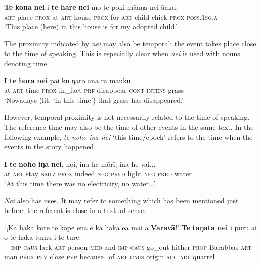 \ea\label{ex:4.206}
\gll \textbf{Te} \textbf{kona} \textbf{nei} {\ꞌ}i \textbf{te} \textbf{hare} \textbf{nei} mo te poki mā{\ꞌ}aŋa nei {\ꞌ}ā{\ꞌ}aku. \\
\textsc{art} place \textsc{prox} at \textsc{art} house \textsc{prox} for \textsc{art} child chick \textsc{prox} \textsc{poss.1sg.a} \\

\glt
‘This place (here) in this house is for my adopted child.’ \textstyleExampleref{[R229.271]} 
\z

The proximity indicated by \textit{nei} may also be temporal: the event takes place close to the time of speaking. This is especially clear when \textit{nei} is used with nouns denoting time.

\ea\label{ex:4.207}
\gll \textbf{{\ꞌ}I} \textbf{te} \textbf{hora} \textbf{nei} pa{\ꞌ}i ku ŋaro {\ꞌ}ana rā mauku.\\
at \textsc{art} time \textsc{prox} in\_fact \textsc{prf} disappear \textsc{cont} \textsc{intens} grass\\

\glt
‘Nowadays (lit. ‘in this time’) that grass has disappeared.’ \textstyleExampleref{[R106.050]} 
\z

However, temporal proximity is not necessarily related to the time of speaking. The reference time may also be the time of other events in the same text. In the following example, \textit{te noho iŋa nei} ‘this time/epoch’ refers to the time when the events in the story happened. 

\ea\label{ex:4.208}
\gll \textbf{{\ꞌ}I} \textbf{te} \textbf{noho} \textbf{iŋa} \textbf{nei}, ho{\ꞌ}i, {\ꞌ}ina he mōrī, {\ꞌ}ina he vai... \\
at \textsc{art} stay \textsc{nmlz} \textsc{prox} indeed \textsc{neg} \textsc{pred} light \textsc{neg} \textsc{pred} water \\

\glt
‘At this time there was no electricity, no water...’ \textstyleExampleref{[R539-1.092]}
\z

\textit{Nei} also has  uses. It may refer to something which has been mentioned just before; the referent is close in a textual sense.

\ea\label{ex:4.209}
\gll ‘¡Ka haka kore te kope ena {\ꞌ}e ka haka e{\ꞌ}a mai a \textbf{Varavā}!’  \textbf{Te} \textbf{taŋata} \textbf{nei} i puru ai {\ꞌ}o te haka tumu i te ture.\\
~~\textsc{imp} \textsc{caus} lack \textsc{art} person \textsc{med} and \textsc{imp} \textsc{caus} go\_out hither \textsc{prop} Barabbas  \textsc{art} man \textsc{prox} \textsc{pfv} close \textsc{pvp} because\_of \textsc{art} \textsc{caus} origin \textsc{acc} \textsc{art} quarrel\\

